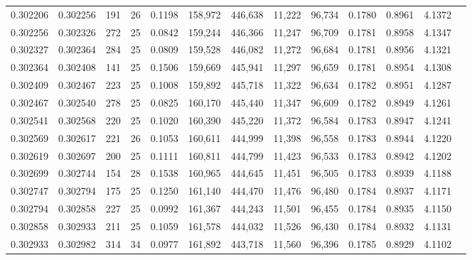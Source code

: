 \begin{tabular}{rrrrrrrrrrrrr}
0.302206 & 0.302256 &   191 &  26 &                                     0.1198 & 158,972 & 446,638 &  11,222 &  96,734 & 0.1780 & 0.8961 & 4.1372 \\
0.302256 & 0.302326 &   272 &  25 &                                     0.0842 & 159,244 & 446,366 &  11,247 &  96,709 & 0.1781 & 0.8958 & 4.1347 \\
0.302327 & 0.302364 &   284 &  25 &                                     0.0809 & 159,528 & 446,082 &  11,272 &  96,684 & 0.1781 & 0.8956 & 4.1321 \\
0.302364 & 0.302408 &   141 &  25 &                                     0.1506 & 159,669 & 445,941 &  11,297 &  96,659 & 0.1781 & 0.8954 & 4.1308 \\
0.302409 & 0.302467 &   223 &  25 &                                     0.1008 & 159,892 & 445,718 &  11,322 &  96,634 & 0.1782 & 0.8951 & 4.1287 \\
0.302467 & 0.302540 &   278 &  25 &                                     0.0825 & 160,170 & 445,440 &  11,347 &  96,609 & 0.1782 & 0.8949 & 4.1261 \\
0.302541 & 0.302568 &   220 &  25 &                                     0.1020 & 160,390 & 445,220 &  11,372 &  96,584 & 0.1783 & 0.8947 & 4.1241 \\
0.302569 & 0.302617 &   221 &  26 &                                     0.1053 & 160,611 & 444,999 &  11,398 &  96,558 & 0.1783 & 0.8944 & 4.1220 \\
0.302619 & 0.302697 &   200 &  25 &                                     0.1111 & 160,811 & 444,799 &  11,423 &  96,533 & 0.1783 & 0.8942 & 4.1202 \\
0.302699 & 0.302744 &   154 &  28 &                                     0.1538 & 160,965 & 444,645 &  11,451 &  96,505 & 0.1783 & 0.8939 & 4.1188 \\
0.302747 & 0.302794 &   175 &  25 &                                     0.1250 & 161,140 & 444,470 &  11,476 &  96,480 & 0.1784 & 0.8937 & 4.1171 \\
0.302794 & 0.302858 &   227 &  25 &                                     0.0992 & 161,367 & 444,243 &  11,501 &  96,455 & 0.1784 & 0.8935 & 4.1150 \\
0.302858 & 0.302933 &   211 &  25 &                                     0.1059 & 161,578 & 444,032 &  11,526 &  96,430 & 0.1784 & 0.8932 & 4.1131 \\
0.302933 & 0.302982 &   314 &  34 &                                     0.0977 & 161,892 & 443,718 &  11,560 &  96,396 & 0.1785 & 0.8929 & 4.1102 \\

\end{tabular}
